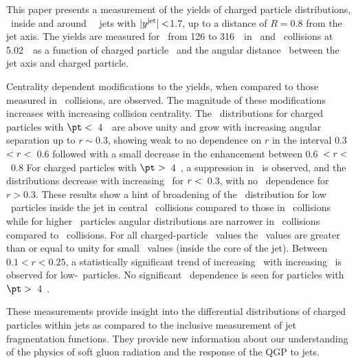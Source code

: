 
This paper presents a measurement of the yields of charged particle distributions, \Dptr\, inside and around \RFour\ \antikt\ jets with $|\mbox{$y^{\mathrm{jet}}$}| <$1.7, up to a distance of $R = 0.8$ from the jet axis. The yields are measured for \ptjet\ from 126 to 316~\GeV\ in \PbPb\ and \pp\ collisions at 5.02~\TeV\ as a function of charged particle \pt\ and the angular distance \rvar\ between the jet axis and charged particle.

Centrality dependent modifications to the yields, when compared to those measured in \pp\ collisions, are observed. The magnitude of these modifications increases with increasing collision centrality. 
The \RDptr\ distributions for charged particles with $\pt <$~4~\GeV\ 
are above unity and 
grow with increasing angular separation up to $r \sim0.3$, showing weak to no dependence on $r$ in the interval 0.3~$< \mbox{$r$} <$~0.6 followed with a small decrease in the enhancement between 0.6~$< \mbox{$r$} <$~0.8
For charged particles with $\pt >$~4~\GeV, a suppression in \RDptr\ is observed, and the 
distributions decrease with increasing
\rvar\ for $\mbox{$r$} < $~0.3, with no \rvar\ dependence for $r>0.3$. 
These results show a hint of broadening of the \Dptr\ distribution for low \pt\ particles inside the jet
in central \pbpb\ collisions compared to those in \pp\ collisions while for higher \pt\ particles
angular distributions are narrower in \pbpb\ collisions compared to \pp\ collisions.
For all charged-particle \pt\ values the \RDptr\ values are greater than or equal to unity for
small \rvar\ values (inside the core of the jet).
Between $0.1 < r < 0.25$, a statistically significant trend of increasing \RDptr\ with increasing \ptjet\ is observed for low-\pt\ particles. No significant \ptjet\ dependence is seen for particles  with $\pt >$~4~\GeV.

These measurements provide insight into the differential distributions of charged particles within jets as compared to the inclusive measurement of jet fragmentation functions. %
They provide new information about our understanding of the physics of soft
gluon radiation and the response of the QGP to jets.

